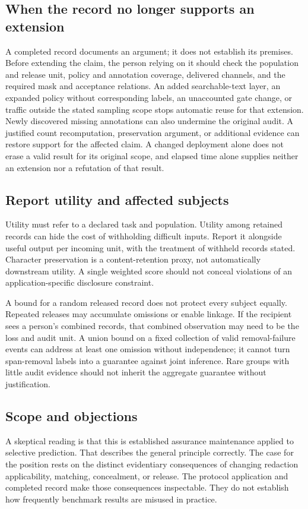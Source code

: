 \documentclass[conference]{IEEEtran}
\begin{document}
\subsection{When the record no longer supports an extension}
A completed record documents an argument; it does not establish its premises. Before extending the claim, the person relying on it should check the population and release unit, policy and annotation coverage, delivered channels, and the required mask and acceptance relations. An added searchable-text layer, an expanded policy without corresponding labels, an unaccounted gate change, or traffic outside the stated sampling scope stops automatic reuse for that extension. Newly discovered missing annotations can also undermine the original audit. A justified count recomputation, preservation argument, or additional evidence can restore support for the affected claim. A changed deployment alone does not erase a valid result for its original scope, and elapsed time alone supplies neither an extension nor a refutation of that result.

\subsection{Report utility and affected subjects}
Utility must refer to a declared task and population. Utility among retained records can hide the cost of withholding difficult inputs. Report it alongside useful output per incoming unit, with the treatment of withheld records stated. Character preservation is a content-retention proxy, not automatically downstream utility. A single weighted score should not conceal violations of an application-specific disclosure constraint.

\newpage
A bound for a random released record does not protect every subject equally. Repeated releases may accumulate omissions or enable linkage. If the recipient sees a person's combined records, that combined observation may need to be the loss and audit unit. A union bound on a fixed collection of valid removal-failure events can address at least one omission without independence; it cannot turn span-removal labels into a guarantee against joint inference. Rare groups with little audit evidence should not inherit the aggregate guarantee without justification.

\subsection{Scope and objections}
A skeptical reading is that this is established assurance maintenance applied to selective prediction. That describes the general principle correctly. The case for the position rests on the distinct evidentiary consequences of changing redaction applicability, matching, concealment, or release. The protocol application and completed record make those consequences inspectable. They do not establish how frequently benchmark results are misused in practice.
\end{document}
